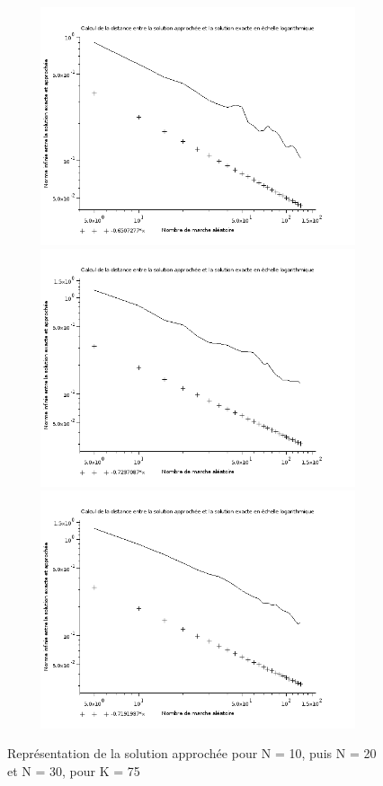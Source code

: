 \documentclass[12pt, a4paper]{article}
\begin{document}
\begin{figure}[p]
    \begin{center}
        \caption{Représentation de la solution approchée pour N = 10, puis N = 20 et N = 30, pour K = 75}
        \includegraphics[width=13cm,height=7cm]{ResultatsConvergences/Convergence_K5_S25_N10.png}
        \includegraphics[width=13cm,height=7cm]{ResultatsConvergences/Convergence_K5_S25_N20.png}
        \includegraphics[width=13cm,height=7cm]{ResultatsConvergences/Convergence_K5_S25_N30.png}
        \label{convergence75}
    \end{center}
\end{figure}
\end{document}
